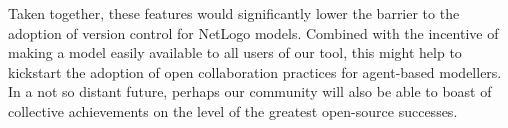 \documentclass[runningheads]{llncs}
\begin{document}
Taken together, these features would significantly lower the barrier to the adoption of version control for NetLogo models. Combined with the incentive of making a model easily available to all users of our tool, this might help to kickstart the adoption of open collaboration practices for agent-based modellers. In a not so distant future, perhaps our community will also be able to boast of collective achievements on the level of the greatest open-source successes.


\end{document}
